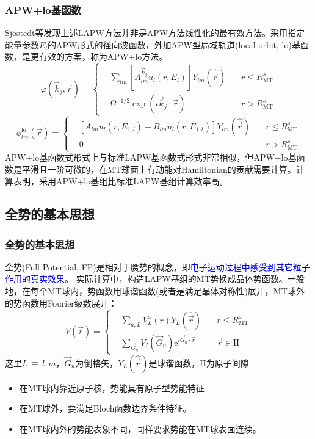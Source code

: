 \frame
{
\frametitle{\textrm{APW+lo}基函数}
\textrm{Sj\"ostedt}等发现上述\textrm{LAPW}方法并非是\textrm{APW}方法线性化的最有效方法。采用指定能量参数$E_l$的\textrm{APW}形式的径向波函数，外加\textrm{APW}型局域轨道(\textrm{local orbit, lo})基函数，是更有效的方案，称为\textrm{APW+lo}方法。
$$  \varphi(\vec k_j,\vec r)=\left\{
  \begin{aligned}
    &\sum_{lm}[A^{\vec k_j}_{lm}u_l(r,E_l)]Y_{lm}(\hat{\vec r})\quad&r\leqslant R_{\mathrm{MT}}^s\\
    &\Omega^{-1/2}\exp(i\vec k_j\cdot\vec r) &r>R_{\mathrm{MT}}^s
  \end{aligned}\right.
  \label{eq:APW-basis}
$$
$$  \phi_{lm}^{\mathrm{lo}}(\vec r)=\left\{
  \begin{aligned}
  &[A_{lm}u_l(r,E_{1,l})+B_{lm}\dot u_l(r,E_{1,l})]Y_{lm}(\hat{\vec r})\quad&r\leqslant R_{\mathrm{MT}}^s\\
  &0&r>R_{\mathrm{MT}}^s
  \end{aligned}
\right.$$
\textrm{APW+lo}基函数式形式上与标准\textrm{LAPW}基函数式形式非常相似，但\textrm{APW+lo}基函数是平滑且一阶可微的，在\textrm{MT}球面上有动能对\textrm{Hamiltonian}的贡献需要计算。计算表明，采用\textrm{APW+lo}基组比标准\textrm{LAPW}基组计算效率高。
}

\subsection{全势的基本思想}
\frame
{
\frametitle{全势的基本思想}
全势\textrm{(Full Potential, FP)}是相对于赝势的概念，即\textcolor{blue}{电子运动过程中感受到其它粒子作用的真实效果}。
实际计算中，构造\textrm{LAPW}基组的\textrm{MT}势换成晶体势函数。一般地，在每个\textrm{MT}球内，势函数用球谐函数(或者是满足晶体对称性)展开，\textrm{MT}球外的势函数用\textrm{Fourier}级数展开：%
{\footnotesize$$ V(\vec r)=\left\{
  \begin{aligned}
    &\sum_{a,L}V_L^a(r)Y_L(\hat{\vec r})\quad &r\leqslant R_{\mathrm{MT}}^a\\
    &\sum_{\vec G_n}V_I(\vec G_n)\textrm{e}^{i\vec G_n\cdot\vec r} &\vec r\in\mathrm{II}
  \end{aligned}\right.
  \label{eq:solid-63}
$$}
这里$L$\,$\equiv$\,$l,m$，$\vec G_n$为倒格矢，$Y_L(\hat{\vec r})$是球谐函数，\textrm{II}为原子间隙
\begin{itemize}
	\item 在\textrm{MT}球内靠近原子核，势能具有原子型势能特征
	\item 在\textrm{MT}球外，要满足\textrm{Bloch}函数边界条件特征。
	\item 在\textrm{MT}球内外的势能表象不同，同样要求势能在\textrm{MT}球表面连续。
\end{itemize}
}

